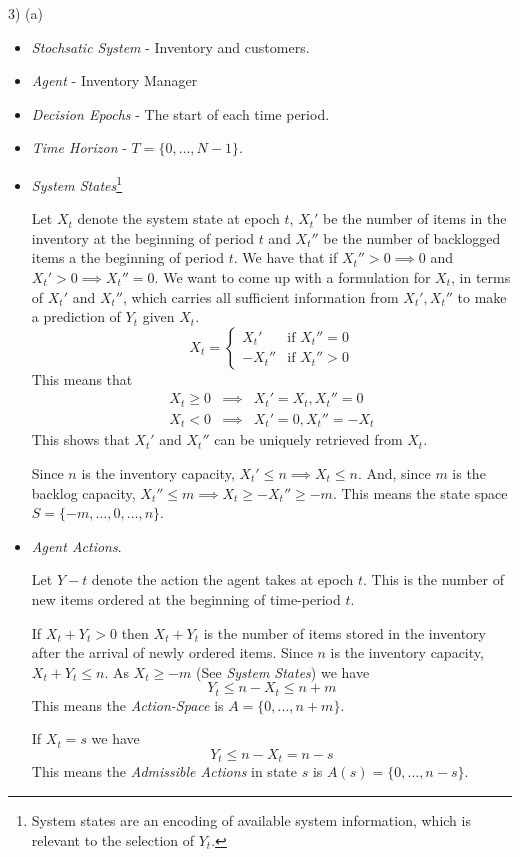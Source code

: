 \documentclass[11pt,a4paper]{article}
\begin{document}
\begin{answer}{3) (a)}
  \begin{itemize}
    \item \textit{Stochsatic System} - Inventory and customers.
    \item \textit{Agent} - Inventory Manager
    \item \textit{Decision Epochs} - The start of each time period.
    \item \textit{Time Horizon} - $T=\{0,\dots,N-1\}$.

    \item \textit{System States}\footnote{System states are an encoding of available system information, which is relevant to the selection of $Y_t$.}
    \par Let $X_t$ denote the system state at epoch $t$, $X_t'$ be the number of items in the inventory at the beginning of period $t$ and $X_t''$ be the number of backlogged items a the beginning of period $t$. We have that if ${X_t''>0\implies 0}$ and ${X_t'>0\implies X_t''=0}$. We want to come up with a formulation for $X_t$, in terms of $X_t'$ and $X_t''$, which carries all sufficient information from $X_t',X_t''$ to make a prediction of $Y_t$ given $X_t$.
    \[ X_t=\begin{cases}
      X_t'&\text{if }X_t''=0\\
      -X_t''&\text{if }X_t''>0
    \end{cases} \]
    This means that
    \[\begin{array}{rcl}
      X_t\geq0&\implies&X_t'=X_t,X_t''=0\\
      X_t<0&\implies&X_t'=0,X_t''=-X_t
    \end{array}\]
    This shows that $X_t'$ and $X_t''$ can be uniquely retrieved from $X_t$.
    \par Since $n$ is the inventory capacity, $X_t'\leq n\implies X_t\leq n$. And, since $m$ is the backlog capacity, $X_t''\leq m\implies X_t\geq-X_t''\geq-m$. This means the state space $S=\{-m,\dots,0,\dots,n\}$.

    \item \textit{Agent Actions}.
    \par Let $Y-t$ denote the action the agent takes at epoch $t$. This is the number of new items ordered at the beginning of time-period $t$.
    \par If $X_t+Y_t>0$ then $X_t+Y_t$ is the number of items stored in the inventory after the arrival of newly ordered items. Since $n$ is the inventory capacity, $X_t+Y_t\leq n$. As $X_t\geq-m$ (See \textit{System States}) we have
    \[ Y_t\leq n-X_t\leq n+m \]
    This means the \textit{Action-Space} is $A=\{0,\dots,n+m\}$.
    \par If $X_t=s$  we have
    \[ Y_t\leq n-X_t=n-s \]
    This means the \textit{Admissible Actions} in state $s$ is $A(s)=\{0,\dots,n-s\}$.


\end{itemize}
\end{answer}
\end{document}
